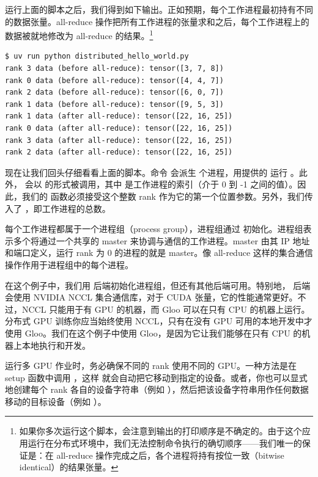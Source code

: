运行上面的脚本之后，我们得到如下输出。正如预期，每个工作进程最初持有不同的数据张量。all-reduce 操作把所有工作进程的张量求和之后，每个工作进程上的数据被就地修改为 all-reduce 的结果。\footnote{如果你多次运行这个脚本，会注意到输出的打印顺序是不确定的。由于这个应用运行在分布式环境中，我们无法控制命令执行的确切顺序——我们唯一的保证是：在 all-reduce 操作完成之后，各个进程将持有按位一致（bitwise identical）的结果张量。}

\begin{lstlisting}
$ uv run python distributed_hello_world.py
rank 3 data (before all-reduce): tensor([3, 7, 8])
rank 0 data (before all-reduce): tensor([4, 4, 7])
rank 2 data (before all-reduce): tensor([6, 0, 7])
rank 1 data (before all-reduce): tensor([9, 5, 3])
rank 1 data (after all-reduce): tensor([22, 16, 25])
rank 0 data (after all-reduce): tensor([22, 16, 25])
rank 3 data (after all-reduce): tensor([22, 16, 25])
rank 2 data (after all-reduce): tensor([22, 16, 25])
\end{lstlisting}

现在让我们回头仔细看看上面的脚本。命令  会派生  个进程，用提供的  运行 。此外， 会以  的形式被调用，其中  是工作进程的索引（介于 0 到 -1 之间的值）。因此，我们的  函数必须接受这个整数 rank 作为它的第一个位置参数。另外，我们传入了 ，即工作进程的总数。

每个工作进程都属于一个进程组（process group），进程组通过  初始化。进程组表示多个将通过一个共享的 master 来协调与通信的工作进程。master 由其 IP 地址和端口定义，运行 rank 为 0 的进程的就是 master。像 all-reduce 这样的集合通信操作作用于进程组中的每个进程。

在这个例子中，我们用  后端初始化进程组，但还有其他后端可用。特别地， 后端会使用 NVIDIA NCCL 集合通信库，对于 CUDA 张量，它的性能通常更好。不过，NCCL 只能用于有 GPU 的机器，而 Gloo 可以在只有 CPU 的机器上运行。分布式 GPU 训练你应当始终使用 NCCL，只有在没有 GPU 可用的本地开发中才使用 Gloo。我们在这个例子中使用 Gloo，是因为它让我们能够在只有 CPU 的机器上本地执行和开发。

运行多 GPU 作业时，务必确保不同的 rank 使用不同的 GPU。一种方法是在 setup 函数中调用 ，这样  就会自动把它移动到指定的设备。或者，你也可以显式地创建每个 rank 各自的设备字符串（例如 ），然后把该设备字符串用作任何数据移动的目标设备（例如 ）。

